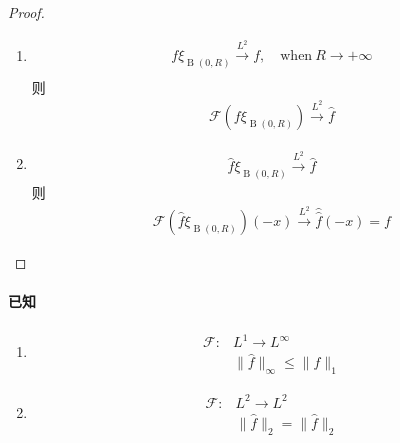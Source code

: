 \begin{proof}
\begin{enumerate}[leftmargin=1cm, label=(\arabic*)]
\begin{proof}
       当$f\in L^2(\mathbb{R}^n)$，由于$\varphi_k\in\mathcal{S}$，
       \begin{align*}
           \|\varphi_k\|_2 = \|\widehat{\varphi}\|_2
       \end{align*}
       令$k\to\infty$即得
       \begin{align*}
           \|f\|_2 = \|\widehat{f}\|_2
       \end{align*}
    \end{proof}

    \item 
    \begin{align*}
        f\xi_{\operatorname{B}(0,R)} \overset{L^2}{\to} f ,\quad\text{when}\ R\to +\infty \\
    \end{align*}
    则
    \begin{align*}
        \mathcal{F}(f\xi_{\operatorname{B}(0,R)}) \overset{L^2}{\to} \widehat{f} 
    \end{align*}

    \item 
    \begin{align*}
        \widehat{f}\xi_{\operatorname{B}(0,R)} \overset{L^2}{\to} \widehat{f}  
    \end{align*}
    则
    \begin{align*}
        \mathcal{F}\left(\widehat{f}\xi_{\operatorname{B}(0,R)} \right)(-x) \overset{L^2}{\to} \widehat{\widehat{f}}(-x) = f  
    \end{align*}
\end{enumerate}
\end{proof}


\paragraph{已知}
\begin{enumerate}[leftmargin=1cm, label=(\arabic*)]
    \item 
    \begin{align*}
        \mathcal{F}:& L^1 \to L^{\infty} \\
        & \|\widehat{f}\|_{\infty} \leqslant \|f\|_1
    \end{align*}
    \item 
    \begin{align*}
        \mathcal{F}: & L^2 \to L^2 \\
        & \|\widehat{f}\|_2 = \|\widehat{f}\|_2
    \end{align*}
\end{enumerate}


